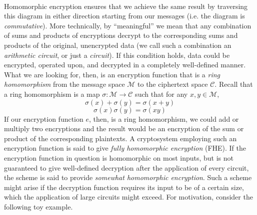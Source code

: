 \documentclass[11pt]{report}
\newcommand{\M}{\mathcal{M}}
\begin{document}
\

Homomorphic encryption ensures that we achieve the same result by traversing this diagram in either direction starting from our messages (i.e. the diagram is \emph{commutative}). More technically, by ``meaningful'' we mean that any combination of sums and products of encryptions decrypt to the corresponding sums and products of the original, unencrypted data (we call such a combination an \emph{arithmetic circuit}, or just a \emph{circuit}). If this condition holds, data could be encrypted, operated upon, and decrypted in a completely well-defined manner. What we are looking for, then, is an encryption function that is a \emph{ring homomorphism} from the message space $\M$ to the ciphertext space $\mathcal{C}$. Recall that a ring homomorphism is a map $\sigma: \M \rightarrow \mathcal{C}$ such that for any $x,y\in \M$, \[\sigma(x)+\sigma(y) = \sigma(x+y)\] \[\sigma(x) \sigma(y) = \sigma(xy)\] If our encryption function $e$, then, is a ring homomorphism, we could add or multiply two encryptions and the result would be an encryption of the sum or product of the corresponding plaintexts. A cryptosystem employing such an encryption function is said to give \emph{fully homomorphic encryption} (FHE). If the encryption function in question is homomorphic on most inputs, but is not guaranteed to give well-defined decryption after the application of every circuit, the scheme is said to provide \emph{somewhat homomorphic encryption}. Such a scheme might arise if the decryption function requires its input to be of a certain size, which the application of large circuits might exceed. For motivation, consider the following toy example.
\end{document}

